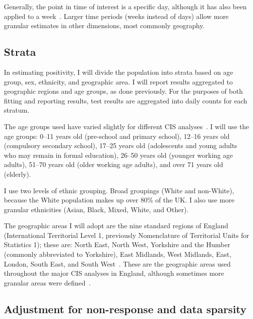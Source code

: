 \documentclass[thesis.tex]{subfiles}
\begin{document}
Generally, the point in time of interest is a specific day, although it has also been applied to a week~\autocite{cisMethodsONS,pouwelsMRPvaccination,pouwelsCommunity}.
Larger time periods (\ie weeks instead of days) allow more granular estimates in other dimensions, most commonly geography.

\subsection{Strata} \label{biology-data:sec:cis-strata}

In estimating positivity, I will divide the population into strata based on age group, sex, ethnicity, and geographic area.
I will report results aggregated to geographic regions and age groups, as done previously.
For the purposes of both fitting and reporting results, test results are aggregated into daily counts for each stratum.

The age groups used have varied slightly for different CIS analyses~\autocite[e.g.][]{pouwelsMRPvaccination,pouwelsCommunity,cisMethodsONS,houseInferring,walkerTracking}.
I will use the age groups: 0--11 years old (pre-school and primary school), 12--16 years old (compulsory secondary school), 17--25 years old (adolescents and young adults who may remain in formal education), 26--50 years old (younger working age adults), 51--70 years old (older working age adults), and over 71 years old (elderly).

I use two levels of ethnic grouping.
Broad groupings (White and non-White), because the White population makes up over 80\% of the UK.
I also use more granular ethnicities (Asian, Black, Mixed, White, and Other).

The geographic areas I will adopt are the nine standard regions of England (International Territorial Level 1, previously Nomenclature of Territorial Units for Statistics 1); these are: North East, North West, Yorkshire and the Humber (commonly abbreviated to Yorkshire), East Midlands, West Midlands, East, London, South East, and South West~\autocite{onsRegions}.
These are the geographic areas used throughout the major CIS analyses in England, although sometimes more granular areas were defined~\autocite[e.g.][]{pouwelsMRPvaccination,pouwelsCommunity,cisMethodsONS,houseInferring,walkerTracking}.

\subsection{Adjustment for non-response and data sparsity} \label{biology-data:sec:MRP}
\end{document}
